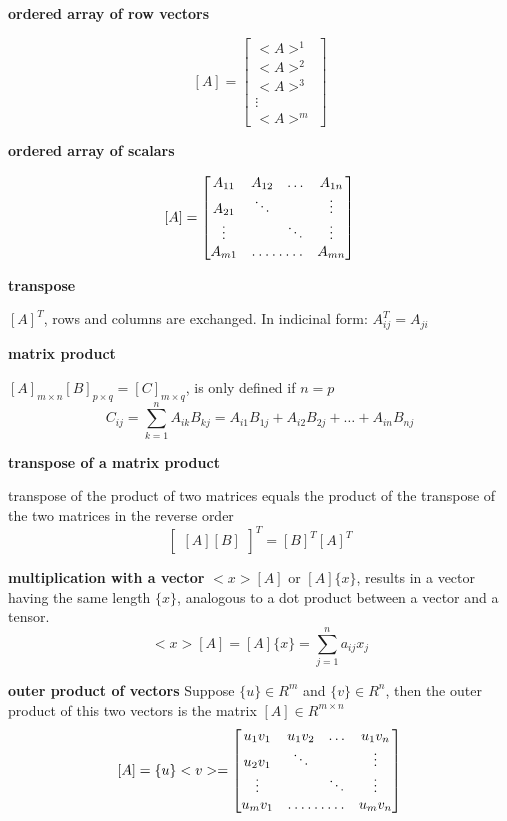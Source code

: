 \documentclass[letterpaper, 10pt, oneside]{article}
\newenvironment{dd}[1]{
	\noindent
	\textbf{\normalsize{#1}}
	\hspace{0.1in}
	\small
	\rmfamily
	}
	{\medskip}
\begin{document}
\begin{dd}{ordered array of row vectors}
	\[ [A] =
	\begin{bmatrix}
	<A>^1 \\ <A>^2 \\ <A>^3 \\ \vdots \\ <A>^m 
	\end{bmatrix}
	\]
\end{dd}

\begin{dd}{ordered array of scalars}
	\[ [A] =
	\begin{bmatrix}
	A_{11} & A_{12} & \hdots & A_{1n} \\
	A_{21} & \ddots & & \vdots\\
	\vdots & & \ddots & \vdots\\
	A_{m1} & \hdotsfor{2} & A_{mn}
	\end{bmatrix}
	\]
\end{dd}

\begin{dd}{transpose}
$[A]^T$, rows and columns are exchanged. In indicinal form: $A_{ij}^T = A_{ji}$
\end{dd}

\begin{dd}{matrix product}
$[A]_{m \times n} [B]_{p \times q}=[C]_{m \times q}$, is only defined if $n = p$
$$C_{ij} = \sum_{k=1}^n A_{ik}B_{kj} = A_{i1}B_{1j}+ A_{i2}B_{2j} + \hdots + A_{in}B_{nj}$$
\end{dd}

\begin{dd}{transpose of a matrix product}
transpose of the product of two matrices equals the product of the transpose of the two matrices in the reverse order
\[
\begin{bmatrix}
[A][B]
\end{bmatrix}^T
 = [B]^T[A]^T \]
\end{dd}

\begin{dd}{multiplication with a vector} $<x>[A]$ or $[A]\{x\}$, results in a vector having the same length $\{x\}$, analogous to a dot product between a vector and a tensor.
$$<x>[A] = [A]\{x\}=\sum_{j=1}^n a_{ij} x_j$$

\end{dd}

\begin{dd}{outer product of vectors} Suppose $\{u\} \in R^m$ and $\{v\} \in R^n$, then the outer product of this two vectors is the matrix $[A] \in R^{m \times n}$
\[[A] = \{u\}<v> = 
	\begin{bmatrix}
	u_1 v_1 & u_1 v_2 & \hdots & u_1 v_n \\
	u_2 v_1 & \ddots & & \vdots\\
	\vdots & & \ddots & \vdots\\
	u_m v_1 & \hdotsfor{2} & u_m v_n
	\end{bmatrix}
	\]
\end{dd}
\end{document}
